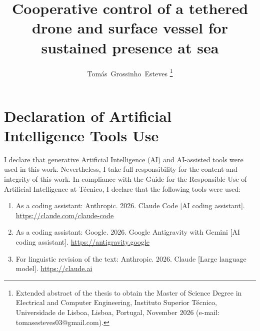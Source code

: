\documentclass[journal,a4paper]{IEEEtran}
\title{Cooperative control of a tethered drone and surface vessel for sustained presence at sea}
\author{Tom\'{a}s~Grossinho~Esteves%
\thanks{Extended abstract of the thesis to obtain the Master of Science Degree in Electrical and Computer Engineering, Instituto Superior T\'{e}cnico, Universidade de Lisboa, Lisboa, Portugal, November 2026 (e-mail: tomasesteves03@gmail.com).}}
\begin{document}
\maketitle









\section*{Declaration of Artificial Intelligence Tools Use}
I declare that generative Artificial Intelligence (AI) and AI-assisted tools were used in this work. Nevertheless, I take full responsibility for the content and integrity of this work. In compliance with the Guide for the Responsible Use of Artificial Intelligence at T\'{e}cnico, I declare that the following tools were used:
\begin{enumerate}
	\item As a coding assistant: Anthropic. 2026. Claude Code [AI coding assistant]. \url{https://claude.com/claude-code}
	\item As a coding assistant: Google. 2026. Google Antigravity with Gemini [AI coding assistant]. \url{https://antigravity.google}
	\item For linguistic revision of the text: Anthropic. 2026. Claude [Large language model]. \url{https://claude.ai}
\end{enumerate}



\end{document}
